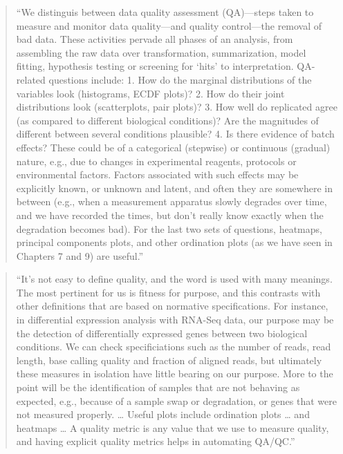 \documentclass[]{tufte-book}
\begin{document}
\begin{quote}
``We distinguis between data quality assessment (QA)---steps taken to measure
and monitor data quality---and quality control---the removal of bad data.
These activities pervade all phases of an analysis, from assembling the raw
data over transformation, summarization, model fitting, hypothesis testing or
screening for `hits' to interpretation. QA-related questions include:
1. How do the marginal distributions of the variables look (histograms,
ECDF plots)? 2. How do their joint distributions look (scatterplots, pair plots)?
3. How well do replicated agree (as compared to different biological conditions)?
Are the magnitudes of different between several conditions plausible?
4. Is there evidence of batch effects? These could be of a categorical (stepwise)
or continuous (gradual) nature, e.g., due to changes in experimental reagents,
protocols or environmental factors. Factors associated with such effects may
be explicitly known, or unknown and latent, and often they are somewhere in
between (e.g., when a measurement apparatus slowly degrades over time, and
we have recorded the times, but don't really know exactly when the degradation
becomes bad). For the last two sets of questions, heatmaps, principal components
plots, and other ordination plots (as we have seen in Chapters 7 and 9) are
useful.'' \citep{holmes2018modern}
\end{quote}

\begin{quote}
``It's not easy to define quality, and the word is used with many meanings. The
most pertinent for us is fitness for purpose, and this contrasts with other
definitions that are based on normative specifications. For instance, in
differential expression analysis with RNA-Seq data, our purpose may be the
detection of differentially expressed genes between two biological conditions.
We can check specificiations such as the number of reads, read length, base
calling quality and fraction of aligned reads, but ultimately these measures in
isolation have little bearing on our purpose. More to the point will be the
identification of samples that are not behaving as expected, e.g., because of
a sample swap or degradation, or genes that were not measured properly.
\ldots{} Useful plots include ordination plots \ldots{} and heatmaps \ldots{}
A quality metric is any value that we use to measure quality, and having
explicit quality metrics helps in automating QA/QC.'' \citep{holmes2018modern}
\end{quote}
\end{document}

